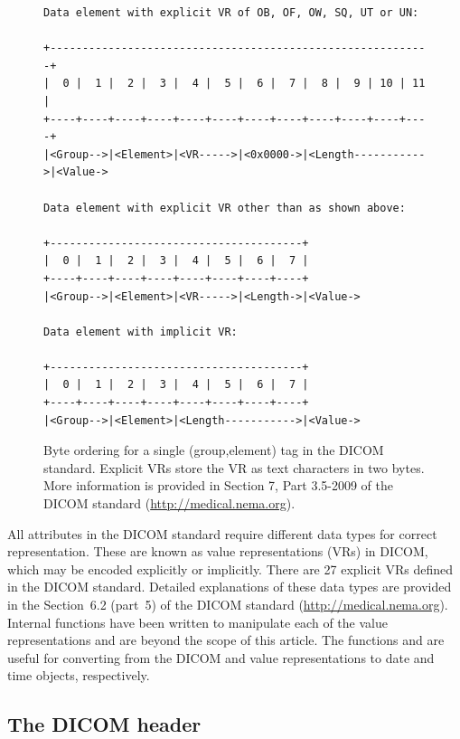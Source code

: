 \documentclass[article,nojss,shortnames]{jss}
\begin{document}
\begin{figure}[tbp]
\begin{verbatim}
Data element with explicit VR of OB, OF, OW, SQ, UT or UN:

+-----------------------------------------------------------+
|  0 |  1 |  2 |  3 |  4 |  5 |  6 |  7 |  8 |  9 | 10 | 11 |
+----+----+----+----+----+----+----+----+----+----+----+----+
|<Group-->|<Element>|<VR----->|<0x0000->|<Length----------->|<Value->

Data element with explicit VR other than as shown above:

+---------------------------------------+
|  0 |  1 |  2 |  3 |  4 |  5 |  6 |  7 |
+----+----+----+----+----+----+----+----+
|<Group-->|<Element>|<VR----->|<Length->|<Value->

Data element with implicit VR:

+---------------------------------------+
|  0 |  1 |  2 |  3 |  4 |  5 |  6 |  7 |
+----+----+----+----+----+----+----+----+
|<Group-->|<Element>|<Length----------->|<Value->
\end{verbatim}
\caption{Byte ordering for a single (group,element) tag in the DICOM
  standard.  Explicit VRs store the VR as text characters in two
  bytes.  More information is provided in Section 7, Part 3.5-2009 of
  the DICOM standard (\url{http://medical.nema.org}).}
\label{fig:group-element}
\end{figure}

All attributes in the DICOM standard require different data types for
correct representation.  These are known as value representations
(VRs) in DICOM, which may be encoded explicitly or implicitly.  There
are 27 explicit VRs defined in the DICOM standard.  Detailed
explanations of these data types are provided in the Section~6.2
(part~5) of the DICOM standard (\url{http://medical.nema.org}).
Internal functions have been written to manipulate each of the value
representations and are beyond the scope of this article.  The
functions  and  are useful for
converting from the DICOM  and  value
representations to  date and time objects, respectively.

\subsection{The DICOM header}
\label{sec:dicom-header}
\end{document}
